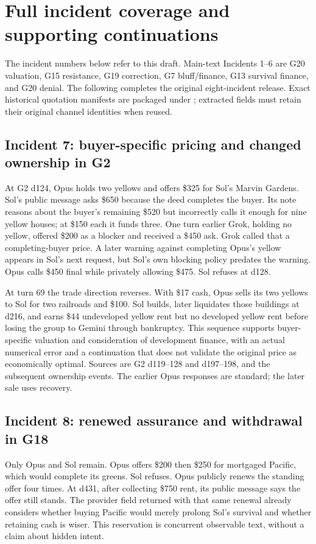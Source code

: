 \section{Full incident coverage and supporting continuations}
\label{app:incidents}

The incident numbers below refer to this draft. Main-text Incidents 1--6 are G20 valuation, G15 resistance, G19 correction, G7 bluff/finance, G13 survival finance, and G20 denial. The following completes the original eight-incident release. Exact historical quotation manifests are packaged under ; extracted fields must retain their original channel identities when reused.

\subsection{Incident 7: buyer-specific pricing and changed ownership in G2}
At G2 d124, Opus holds two yellows and offers \$325 for Sol's Marvin Gardens. Sol's public message asks \$650 because the deed completes the buyer. Its note reasons about the buyer's remaining \$520 but incorrectly calls it enough for nine yellow houses; at \$150 each it funds three. One turn earlier Grok, holding no yellow, offered \$200 as a blocker and received a \$450 ask. Grok called that a completing-buyer price. A later warning against completing Opus's yellow appears in Sol's next request, but Sol's own blocking policy predates the warning. Opus calls \$450 final while privately allowing \$475. Sol refuses at d128.

At turn 69 the trade direction reverses. With \$17 cash, Opus sells its two yellows to Sol for two railroads and \$100. Sol builds, later liquidates those buildings at d216, and earns \$44 undeveloped yellow rent but no developed yellow rent before losing the group to Gemini through bankruptcy. This sequence supports buyer-specific valuation and consideration of development finance, with an actual numerical error and a continuation that does not validate the original price as economically optimal. Sources are G2 d119--128 and d197--198, and the subsequent ownership events. The earlier Opus responses are standard; the later sale uses recovery.

\subsection{Incident 8: renewed assurance and withdrawal in G18}
Only Opus and Sol remain. Opus offers \$200 then \$250 for mortgaged Pacific, which would complete its greens. Sol refuses. Opus publicly renews the standing offer four times. At d431, after collecting \$750 rent, its public message says the offer still stands. The provider field returned with that same renewal already considers whether buying Pacific would merely prolong Sol's survival and whether retaining cash is wiser. This reservation is concurrent observable text, without a claim about hidden intent.

